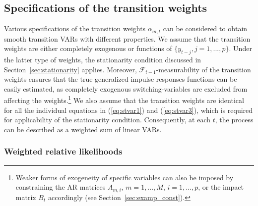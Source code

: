 \documentclass[nojss]{jss}
\begin{document}
\subsection{Specifications of the transition weights}

Various specifications of the transition weights $\alpha_{m,t}$ can be considered to obtain smooth transition VARs with different properties. We assume that the transition weights are either completely exogenous or functions of $\lbrace y_{t-j}, j=1,...,p \rbrace$. Under the latter type of weights, the stationarity condition discussed in Section~\ref{sec:stationarity} applies. Moreover, $\mathcal{F}_{t-1}$-measurability of the transition weights ensures that the true generalized impulse responses functions can be easily estimated, as completely exogenous switching-variables are excluded from affecting the weights.\footnote{Weaker forms of exogeneity of specific variables can also be imposed by constraining the AR matrices $A_{m,i}$, $m=1,...,M$, $i=1,...,p$, or the impact matrix $B_t$ accordingly (see Section~\ref{sec:examp_const}).} We also assume that the transition weights are identical for all the individual equations in (\ref{eq:stvar1}) and (\ref{eq:stvar3}), which is required for applicability of the stationarity condition. Consequently, at each $t$‚ the process can be described as a weighted sum of linear VARs.

\subsubsection{Weighted relative likelihoods}\label{sec:rel_dens}
\end{document}
